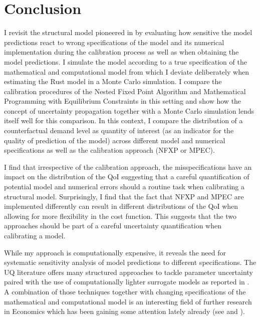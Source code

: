 \section{Conclusion} \label{conclusion}
\thispagestyle{plain} %

I revisit the structural model pioneered in \cite{Rust.1987} by evaluating how sensitive the model predictions react to wrong specifications of the model and its numerical implementation during the calibration process as well as when obtaining the model predictions. I simulate the model according to a true specification of the mathematical and computational model from which I deviate deliberately when estimating the Rust model in a Monte Carlo simulation. I compare the calibration procedures of the Nested Fixed Point Algorithm and Mathematical Programming with Equilibrium Constraints in this setting and show how the concept of uncertainty propagation together with a Monte Carlo simulation lends itself well for this comparison. In this context, I compare the distribution of a counterfactual demand level as quantity of interest (as an indicator for the quality of prediction of the model) across different model and numerical specifications as well as the calibration approach (NFXP or MPEC).

I find that irrespective of the calibration approach, the misspecifications have an impact on the distribution of the QoI suggesting that a careful quantification of potential model and numerical errors should a routine task when calibrating a structural model. Surprisingly, I find that the fact that NFXP and MPEC are implemented differently can result in different distributions of the QoI when allowing for more flexibility in the cost function. This suggests that the two approaches should be part of a careful uncertainty quantification when calibrating a model.

While my approach is computationally expensive, it reveals the need for systematic sensitivity analysis of model predictions to different specifications. The UQ literature offers many structured approaches to tackle parameter uncertainty paired with the use of computationally lighter surrogate models as reported in \cite{Saltelli.2008}. A combination of those techniques together with changing specifications of the mathematical and computational model is an interesting field of further research in Economics which has been gaining some attention lately already (see \cite{Scheidegger.2019} and \cite{Harenberg.2019}).